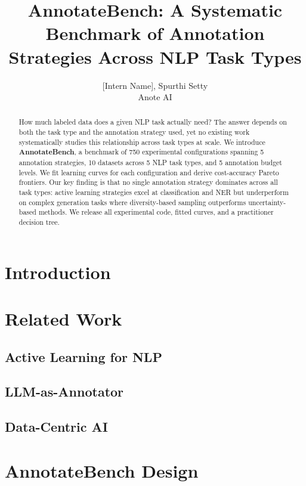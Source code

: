 \documentclass{article}
\title{AnnotateBench: A Systematic Benchmark of Annotation Strategies Across NLP Task Types}
\author{[Intern Name], Spurthi Setty \\
Anote AI}
\date{}
\begin{document}
\maketitle

\begin{abstract}
\noindent
How much labeled data does a given NLP task actually need? The answer depends on both the task type and the annotation strategy used, yet no existing work systematically studies this relationship across task types at scale. We introduce \textbf{AnnotateBench}, a benchmark of 750 experimental configurations spanning 5 annotation strategies, 10 datasets across 5 NLP task types, and 5 annotation budget levels. We fit learning curves for each configuration and derive cost-accuracy Pareto frontiers. Our key finding is that no single annotation strategy dominates across all task types: active learning strategies excel at classification and NER but underperform on complex generation tasks where diversity-based sampling outperforms uncertainty-based methods. We release all experimental code, fitted curves, and a practitioner decision tree.
\end{abstract}

\section{Introduction}

\section{Related Work}
\subsection{Active Learning for NLP}
\subsection{LLM-as-Annotator}
\subsection{Data-Centric AI}

\section{AnnotateBench Design}
\end{document}
